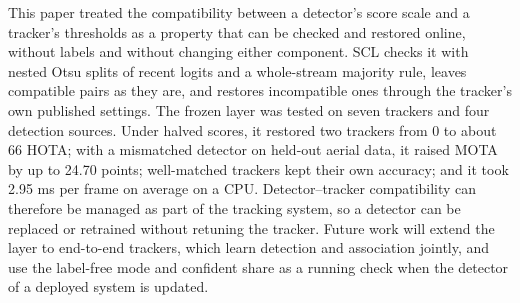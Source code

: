 \documentclass[pdflatex,sn-mathphys-num,iicol]{sn-jnl}
\newcommand{\scl}{SCL}
\begin{document}
This paper treated the compatibility between a detector's score scale and a tracker's thresholds
as a property that can be checked and restored online, without labels and without changing either
component. \scl{} checks it with nested Otsu splits of recent logits and a whole-stream majority
rule, leaves compatible pairs as they are, and restores incompatible ones through the tracker's own
published settings. The frozen layer was tested on seven trackers and four
detection sources. Under halved scores, it restored two trackers from 0 to about 66 HOTA; with a
mismatched detector on held-out aerial data, it raised MOTA by up to 24.70 points; well-matched
trackers kept their own accuracy; and it took 2.95 ms per frame on average on a CPU.
Detector--tracker compatibility can therefore be managed as part of the tracking system, so a
detector can be replaced or retrained without retuning the tracker. Future work will extend the
layer to end-to-end trackers, which learn detection and association jointly, and use the label-free
mode and confident share as a running check when the detector of a deployed system is updated.

\FloatBarrier
\backmatter

\end{document}
